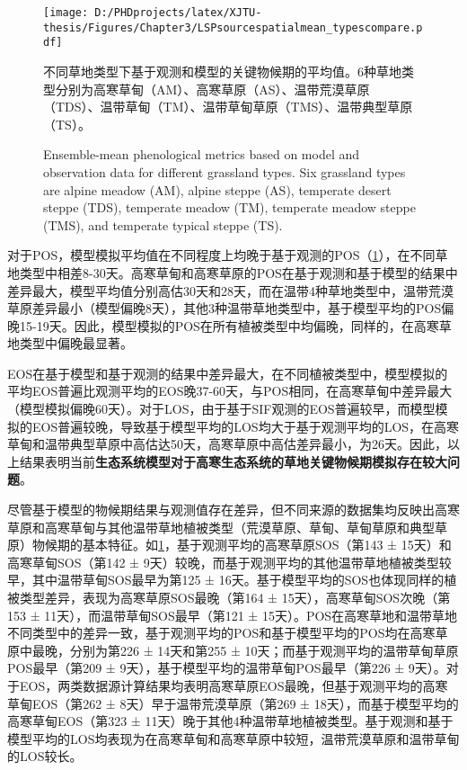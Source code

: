 \begin{figure}[h]
  \centering
  \texttt{[image: D:/PHDprojects/latex/XJTU-thesis/Figures/Chapter3/LSPsourcespatialmean\_typescompare.pdf]}
  \caption{不同草地类型下基于观测和模型的关键物候期的平均值。6种草地类型分别为高寒草甸（AM）、高寒草原（AS）、温带荒漠草原（TDS）、温带草甸（TM）、温带草甸草原（TMS）、温带典型草原（TS）。}
  \addtocounter{figure}{-1}
  \vspace{5pt}
  \renewcommand{\figurename}{Fig}
  \caption{Ensemble-mean phenological metrics based on model and observation data for different grassland types. Six grassland types are alpine meadow (AM), alpine steppe (AS), temperate desert steppe (TDS), temperate meadow (TM), temperate meadow steppe (TMS), and temperate typical steppe (TS).}
  \label{figure33}
\end{figure}

对于POS，模型模拟平均值在不同程度上均晚于基于观测的POS（\cref{figure33}），在不同草地类型中相差8-30天。高寒草甸和高寒草原的POS在基于观测和基于模型的结果中差异最大，模型平均值分别高估30天和28天，而在温带4种草地类型中，温带荒漠草原差异最小（模型偏晚8天），其他3种温带草地类型中，基于模型平均的POS偏晚15-19天。因此，模型模拟的POS在所有植被类型中均偏晚，同样的，在高寒草地类型中偏晚最显著。

EOS在基于模型和基于观测的结果中差异最大，在不同植被类型中，模型模拟的平均EOS普遍比观测平均的EOS晚37-60天，与POS相同，在高寒草甸中差异最大（模型模拟偏晚60天）。对于LOS，由于基于SIF观测的EOS普遍较早，而模型模拟的EOS普遍较晚，导致基于模型平均的LOS均大于基于观测平均的LOS，在高寒草甸和温带典型草原中高估达50天，高寒草原中高估差异最小，为26天。因此，以上结果表明当前\textbf{生态系统模型对于高寒生态系统的草地关键物候期模拟存在较大问题}。

尽管基于模型的物候期结果与观测值存在差异，但不同来源的数据集均反映出高寒草原和高寒草甸与其他温带草地植被类型（荒漠草原、草甸、草甸草原和典型草原）物候期的基本特征。如\cref{figure33}，基于观测平均的高寒草原SOS（第143 ± 15天）和高寒草甸SOS（第142 ± 9天）较晚，而基于观测平均的其他温带草地植被类型较早，其中温带草甸SOS最早为第125 ± 16天。基于模型平均的SOS也体现同样的植被类型差异，表现为高寒草原SOS最晚（第164 ± 15天），高寒草甸SOS次晚（第153 ± 11天），而温带草甸SOS最早（第121 ± 15天）。POS在高寒草地和温带草地不同类型中的差异一致，基于观测平均的POS和基于模型平均的POS均在高寒草原中最晚，分别为第226 ± 14天和第255 ± 10天；而基于观测平均的温带草甸草原POS最早（第209 ± 9天），基于模型平均的温带草甸POS最早（第226 ± 9天）。对于EOS，两类数据源计算结果均表明高寒草原EOS最晚，但基于观测平均的高寒草甸EOS（第262 ± 8天）早于温带荒漠草原（第269 ± 18天），而基于模型平均的高寒草甸EOS（第323 ± 11天）晚于其他4种温带草地植被类型。基于观测和基于模型平均的LOS均表现为在高寒草甸和高寒草原中较短，温带荒漠草原和温带草甸的LOS较长。

